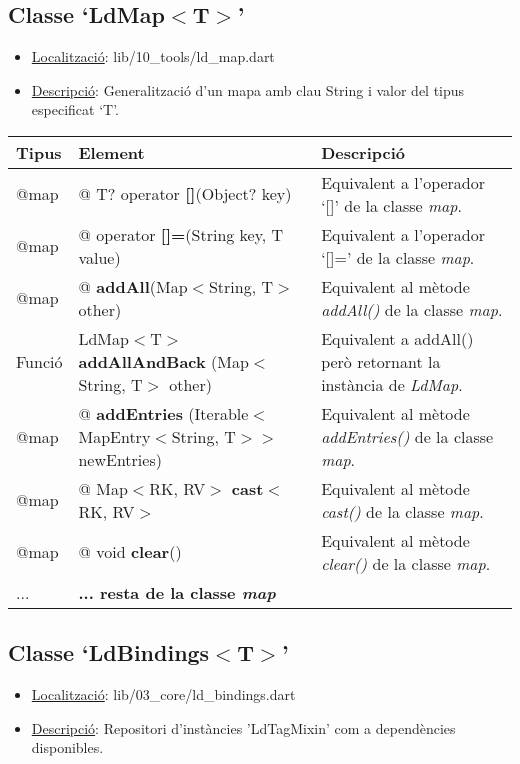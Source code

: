 \documentclass{article}
\begin{document}
\subsection{Classe `LdMap\texorpdfstring{$<$T$>$}{<T>}'}
\begin{itemize}
    \item \underline{Localització}: lib/10\_tools/ld\_map.dart
    \item \underline{Descripció}: Generalització d'un mapa amb clau String i valor del tipus especificat `T'.
\end{itemize}

\begin{longtable}[H]{@{}L{1.25cm}L{4.5cm}L{8.75cm}@{}}
\toprule
\textbf{Tipus} & \textbf{Element} & \textbf{Descripció} \\
\midrule
@map & @ T? operator \textbf{[]}(Object? key) & Equivalent a l'operador `[]' de la classe \textit{map}. \\
@map & @ operator \textbf{[]=}(String key, T value) & Equivalent a l'operador `[]=' de la classe \textit{map}. \\
@map & @ \textbf{addAll}(Map$<$String, T$>$ other) & Equivalent al mètode \textit{addAll()} de la classe \textit{map}. \\
Funció & LdMap$<$T$>$ \textbf{addAllAndBack} (Map$<$String, T$>$ other) & Equivalent a addAll() però retornant la instància de \textit{LdMap}. \\
@map & @ \textbf{addEntries} (Iterable$<$MapEntry$<$String, T$>>$ newEntries) & Equivalent al mètode \textit{addEntries()} de la classe \textit{map}. \\
@map & @ Map$<$RK, RV$>$ \textbf{cast}$<$RK, RV$>$ & Equivalent al mètode \textit{cast()} de la classe \textit{map}. \\
@map & @ void \textbf{clear}() & Equivalent al mètode \textit{clear()} de la classe \textit{map}. \\
... & \textbf{... resta de la classe \textit{map}} & \\
\bottomrule
\end{longtable}

\subsection{Classe `LdBindings$<$T$>$'}
\begin{itemize}
    \item \underline{Localització}: lib/03\_core/ld\_bindings.dart
    \item \underline{Descripció}: Repositori d'instàncies 'LdTagMixin' com a dependències disponibles.
\end{itemize}
\end{document}
